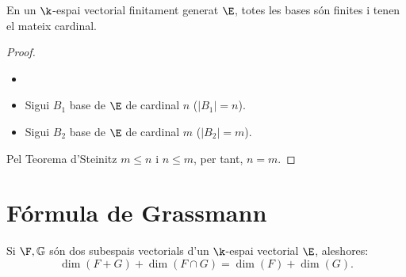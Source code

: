 \begin{col}
En un $\k$-espai vectorial finitament generat $\E$, totes les bases són finites i tenen el mateix cardinal.
\end{col}

\begin{proof}
\begin{itemize}
    \item[]
    \item Sigui $B_1$ base de $\E$  de cardinal $n$ ($|B_1| = n$).
    \item Sigui $B_2$ base de $\E$ de cardinal $m$ ($|B_2| = m$).
\end{itemize}
\noindent
Pel Teorema d'Steinitz $m \leq n$ i $n \leq m$, per tant, $n=m$.
\end{proof}


\section{Fórmula de Grassmann}
Si $\F , \mathbb{G}$ són dos subespais vectorials d'un $\k$-espai vectorial $\E$, aleshores:
\[ \dim(F + G) + \dim(F \cap G) = \dim(F) + \dim(G). \]

